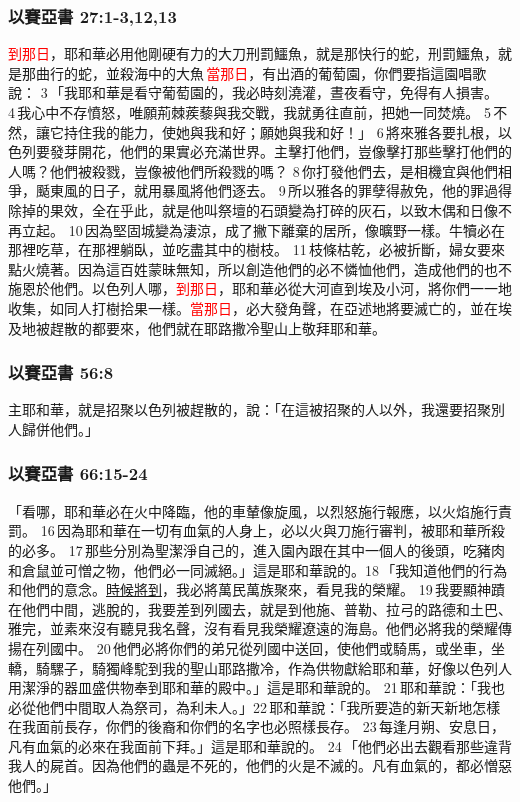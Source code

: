 \subsubsection{以賽亞書 27:1-3,12,13}
\textcolor{red}{到那日}，耶和華必用他剛硬有力的大刀刑罰鱷魚，就是那快行的蛇，刑罰鱷魚，就是那曲行的蛇，並殺海中的大魚\textcolor{red}{ 當那日}，有出酒的葡萄園，你們要指這園唱歌說： 3 「我耶和華是看守葡萄園的，我必時刻澆灌，晝夜看守，免得有人損害。 4 我心中不存憤怒，唯願荊棘蒺藜與我交戰，我就勇往直前，把她一同焚燒。 5 不然，讓它持住我的能力，使她與我和好；願她與我和好！」 6 將來雅各要扎根，以色列要發芽開花，他們的果實必充滿世界。主擊打他們，豈像擊打那些擊打他們的人嗎？他們被殺戮，豈像被他們所殺戮的嗎？ 8 你打發他們去，是相機宜與他們相爭，颳東風的日子，就用暴風將他們逐去。 9 所以雅各的罪孽得赦免，他的罪過得除掉的果效，全在乎此，就是他叫祭壇的石頭變為打碎的灰石，以致木偶和日像不再立起。 10 因為堅固城變為淒涼，成了撇下離棄的居所，像曠野一樣。牛犢必在那裡吃草，在那裡躺臥，並吃盡其中的樹枝。 11 枝條枯乾，必被折斷，婦女要來點火燒著。因為這百姓蒙昧無知，所以創造他們的必不憐恤他們，造成他們的也不施恩於他們。以色列人哪，\textcolor{red}{到那日}，耶和華必從大河直到埃及小河，將你們一一地收集，如同人打樹拾果一樣。\textcolor{red}{當那日}，必大發角聲，在亞述地將要滅亡的，並在埃及地被趕散的都要來，他們就在耶路撒冷聖山上敬拜耶和華。

\subsubsection{以賽亞書 56:8}
主耶和華，就是招聚以色列被趕散的，說：「在這被招聚的人以外，我還要招聚別人歸併他們。」

\subsubsection{以賽亞書 66:15-24}
「看哪，耶和華必在火中降臨，他的車輦像旋風，以烈怒施行報應，以火焰施行責罰。 16 因為耶和華在一切有血氣的人身上，必以火與刀施行審判，被耶和華所殺的必多。 17 那些分別為聖潔淨自己的，進入園內跟在其中一個人的後頭，吃豬肉和倉鼠並可憎之物，他們必一同滅絕。」這是耶和華說的。18 「我知道他們的行為和他們的意念。\underline{時候將到}，我必將萬民萬族聚來，看見我的榮耀。 19 我要顯神蹟在他們中間，逃脫的，我要差到列國去，就是到他施、普勒、拉弓的路德和土巴、雅完，並素來沒有聽見我名聲，沒有看見我榮耀遼遠的海島。他們必將我的榮耀傳揚在列國中。 20 他們必將你們的弟兄從列國中送回，使他們或騎馬，或坐車，坐轎，騎騾子，騎獨峰駝到我的聖山耶路撒冷，作為供物獻給耶和華，好像以色列人用潔淨的器皿盛供物奉到耶和華的殿中。」這是耶和華說的。 21 耶和華說：「我也必從他們中間取人為祭司，為利未人。」22 耶和華說：「我所要造的新天新地怎樣在我面前長存，你們的後裔和你們的名字也必照樣長存。 23 每逢月朔、安息日，凡有血氣的必來在我面前下拜。」這是耶和華說的。 24 「他們必出去觀看那些違背我人的屍首。因為他們的蟲是不死的，他們的火是不滅的。凡有血氣的，都必憎惡他們。」


